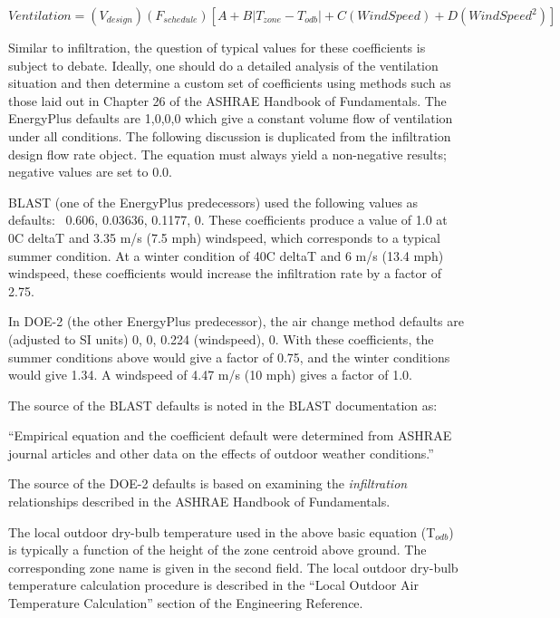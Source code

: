 \begin{equation}
Ventilation = \left( {{V_{design}}} \right)\left( {{F_{schedule}}} \right)\left[ {A + B\left| {{T_{zone}} - {T_{odb}}} \right| + C\left( {WindSpeed} \right) + D\left( {WindSpee{d^2}} \right)} \right]
\end{equation}

Similar to infiltration, the question of typical values for these coefficients is subject to debate. Ideally, one should do a detailed analysis of the ventilation situation and then determine a custom set of coefficients using methods such as those laid out in Chapter 26 of the ASHRAE Handbook of Fundamentals. The EnergyPlus defaults are 1,0,0,0 which give a constant volume flow of ventilation under all conditions. The following discussion is duplicated from the infiltration design flow rate object. The equation must always yield a non-negative results; negative values are set to 0.0.

BLAST (one of the EnergyPlus predecessors) used the following values as defaults:~ 0.606, 0.03636, 0.1177, 0. These coefficients produce a value of 1.0 at 0C deltaT and 3.35 m/s (7.5 mph) windspeed, which corresponds to a typical summer condition. At a winter condition of 40C deltaT and 6 m/s (13.4 mph) windspeed, these coefficients would increase the infiltration rate by a factor of 2.75.

In DOE-2 (the other EnergyPlus predecessor), the air change method defaults are (adjusted to SI units) 0, 0, 0.224 (windspeed), 0. With these coefficients, the summer conditions above would give a factor of 0.75, and the winter conditions would give 1.34. A windspeed of 4.47 m/s (10 mph) gives a factor of 1.0.

The source of the BLAST defaults is noted in the BLAST documentation as:

``Empirical equation and the coefficient default were determined from ASHRAE journal articles and other data on the effects of outdoor weather conditions.''

The source of the DOE-2 defaults is based on examining the \emph{infiltration} relationships described in the ASHRAE Handbook of Fundamentals.

The local outdoor dry-bulb temperature used in the above basic equation (T\(_{odb}\)) is typically a function of the height of the zone centroid above ground. The corresponding zone name is given in the second field. The local outdoor dry-bulb temperature calculation procedure is described in the ``Local Outdoor Air Temperature Calculation'' section of the Engineering Reference.


